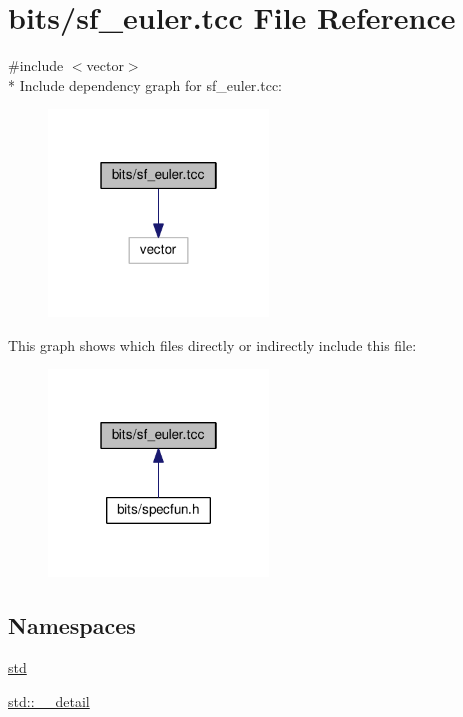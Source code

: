 \hypertarget{sf__euler_8tcc}{}\section{bits/sf\+\_\+euler.tcc File Reference}
\label{sf__euler_8tcc}
{\ttfamily \#include $<$vector$>$}\\*
Include dependency graph for sf\+\_\+euler.\+tcc\+:
\nopagebreak
\begin{figure}[H]
\begin{center}
\leavevmode
\includegraphics[width=166pt]{sf__euler_8tcc__incl}
\end{center}
\end{figure}
This graph shows which files directly or indirectly include this file\+:
\nopagebreak
\begin{figure}[H]
\begin{center}
\leavevmode
\includegraphics[width=166pt]{sf__euler_8tcc__dep__incl}
\end{center}
\end{figure}
\subsection*{Namespaces}
\begin{DoxyCompactItemize}
\item 
 \hyperlink{namespacestd}{std}
\item 
 \hyperlink{namespacestd_1_1____detail}{std\+::\+\_\+\+\_\+detail}
\end{DoxyCompactItemize}
